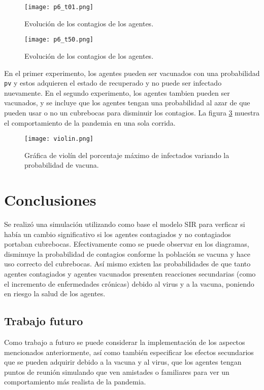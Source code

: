 \documentclass[final,6p,times,twocolumn]{elsarticle}
\begin{document}
\begin{figure} [h!]
    \centering
    \texttt{[image: p6\_t01.png]}
    \caption{Evolución de los contagios de los agentes.}
    \label{fig2}
\end{figure}

\begin{figure} [h!]
    \centering
    \texttt{[image: p6\_t50.png]}
    \caption{Evolución de los contagios de los agentes.}
    \label{fig3}
\end{figure}

En el primer experimento, los agentes pueden ser vacunados con una probabilidad \texttt{pv} y estos adquieren el estado de recuperado y no puede ser infectado nuevamente. En el segundo experimento, los agentes tambien pueden ser vacunados, y se incluye que los agentes tengan una probabilidad al azar de que pueden usar o no un cubrebocas para disminuir los contagios. La figura \ref{fig4} muestra el comportamiento de la pandemia en una sola corrida.

\begin{figure} [h!]
    \centering
    \texttt{[image: violin.png]}
    \caption{Gráfica de violín del porcentaje máximo de infectados variando la probabilidad de vacuna.}
    \label{fig4}
\end{figure}

\section{Conclusiones}
Se realizó una simulación utilizando como base el modelo SIR para verficar si había un cambio significativo si los agentes contagiados y no contagiados portaban cubrebocas. Efectivamente como se puede observar en los diagramas, disminuye la probabilidad de contagios conforme la población se vacuna y hace uso correcto del cubrebocas. Así mismo existen las probabilidades de que tanto agentes contagiados y agentes vacunados presenten reacciones secundarias (como el incremento de enfermedades crónicas) debido al virus y a la vacuna, poniendo en riesgo la salud de los agentes.
\subsection{Trabajo futuro}
Como trabajo a futuro se puede considerar la implementación de los aspectos mencionados anteriormente, así como también especificar los efectos secundarios que se pueden adquirir debido a la vacuna y al virus, que los agentes tengan puntos de reunión simulando que ven amistades o familiares para ver un comportamiento más realista de la pandemia.

\clearpage



\end{document}
